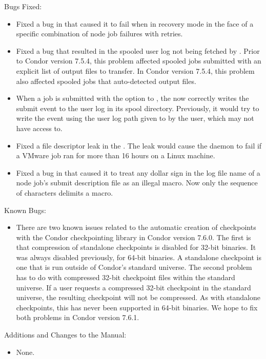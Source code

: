 \noindent Bugs Fixed:

\begin{itemize}

\item Fixed a bug in  that caused it to fail when in recovery
mode in the face of a specific combination of node job failures with
retries.

\item Fixed a bug that resulted in the spooled user log not being
  fetched by .  Prior to Condor version 7.5.4, this
  problem affected spooled jobs submitted with an explicit list of
  output files to transfer.  In Condor version 7.5.4, this problem also
  affected spooled jobs that auto-detected output files.

\item When a job is submitted with the  option to ,
the  now correctly writes the submit event to the user log 
in its spool directory. 
Previously, it would try to write the event using the user
log path given to  by the user, 
which  may not have access to.

\item Fixed a file descriptor leak in the . The leak would
cause the daemon to fail if a VMware job ran for more than 16 hours on a
Linux machine.

\item Fixed a bug in  that caused it to treat any dollar
sign in the log file name of a node job's submit description file
as an illegal  macro.
Now only the sequence of characters \Expr{\$(} delimits a macro.

\end{itemize}

\noindent Known Bugs:

\begin{itemize}

\item There are two known issues related to the automatic creation
of checkpoints with the Condor checkpointing library in 
Condor version 7.6.0.
The first is that compression of
standalone checkpoints is disabled for 32-bit binaries.
It was always disabled previously, for 64-bit binaries.
A standalone checkpoint is one that is run outside
of Condor's standard universe.  The second problem has to do with compressed
32-bit checkpoint files within the standard universe.
If a user requests a compressed 32-bit checkpoint in the standard universe,
the resulting checkpoint will not be compressed.
As with standalone checkpoints, this has never been supported
in 64-bit binaries.  We hope to fix both problems in 
Condor version 7.6.1.

\end{itemize}

\noindent Additions and Changes to the Manual:

\begin{itemize}

\item None.

\end{itemize}

